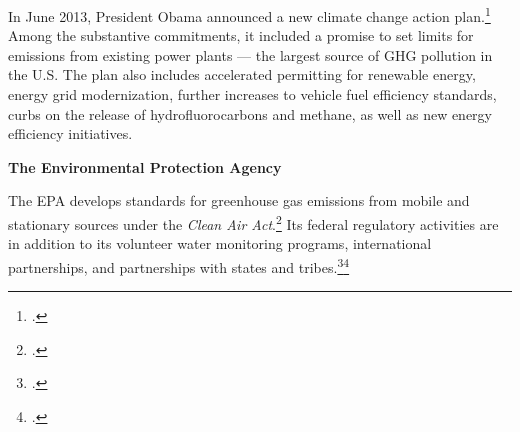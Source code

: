 \documentclass[10pt]{article}
\begin{document}
In June 2013, President Obama announced a new climate change action plan.\footcite[][]{ObamaJune2013}
Among the substantive commitments, it included a promise to set limits for  emissions from existing power plants --- the largest source of GHG pollution in the U.S.
The plan also includes accelerated permitting for renewable energy, energy grid modernization, further increases to vehicle fuel efficiency standards, curbs on the release of hydrofluorocarbons and methane, as well as new energy efficiency initiatives.



\textbf{The Environmental Protection Agency}



The EPA develops standards for greenhouse gas emissions from mobile and stationary sources under the \emph{Clean Air Act}.\footcite[][]{EPAAirEnforcement} Its federal regulatory activities are in addition to its volunteer water monitoring programs, international partnerships, and partnerships with states and tribes.\footcite[][]{EPAVolunteer}\footcite[][]{EPAInternational}
\end{document}
